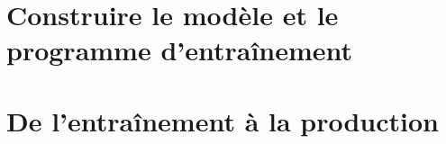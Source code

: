 \documentclass{ml4ebook}     %
\begin{document}
\part{Construire le modèle et le programme d'entraînement}
% 
% 
% 
% 
% 
% 
% 

\part{De l'entraînement à la production}
% 
% 
% 
% 
% 
% 

\backmatter
\cleardoublepage
\printbibliography[heading=bibintoc]
\end{document}
